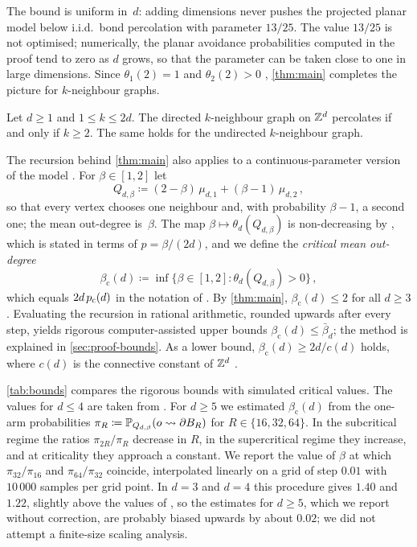 \documentclass[11pt,letterpaper]{article}
\begin{document}
The bound is uniform in~$d$: adding dimensions never pushes the projected planar model below i.i.d.\ bond percolation with parameter $13/25$. The value $13/25$ is not optimised; numerically, the planar avoidance probabilities computed in the proof tend to zero as $d$ grows, so that the parameter can be taken close to one in large dimensions. Since $\theta_1(2)=1$ and $\theta_2(2)>0$ \cite[Theorem~2.3]{CHJK26}, \cref{thm:main} completes the picture for $k$-neighbour graphs.

\begin{corollary}\label{cor:classification}
Let $d\ge1$ and $1\le k\le2d$. The directed $k$-neighbour graph on $\Z^d$ percolates if and only if $k\ge2$. The same holds for the undirected $k$-neighbour graph.
\end{corollary}

The recursion behind \cref{thm:main} also applies to a continuous-parameter version of the model \cite{CHJK26,BJKLRT25}. For $\beta\in[1,2]$ let
\begin{equation*}
Q_{d,\beta}\coloneqq(2-\beta)\,\mu_{d,1}+(\beta-1)\,\mu_{d,2}\,,
\end{equation*}
so that every vertex chooses one neighbour and, with probability $\beta-1$, a second one; the mean out-degree is~$\beta$. The map $\beta\mapsto\theta_d(Q_{d,\beta})$ is non-decreasing by \cite[Lemma~2.1]{CHJK26}, which is stated in terms of $p=\beta/(2d)$, and we define the \emph{critical mean out-degree}
\begin{equation*}
\beta_{\mathrm c}(d)\coloneqq\inf\big\{\beta\in[1,2]\colon\theta_d(Q_{d,\beta})>0\big\}\,,
\end{equation*}
which equals $2d\,\pc(d)$ in the notation of \cite{CHJK26,BJKLRT25}. By \cref{thm:main}, $\beta_{\mathrm c}(d)\le2$ for all $d\ge3$. Evaluating the recursion in rational arithmetic, rounded upwards after every step, yields rigorous computer-assisted upper bounds $\beta_{\mathrm c}(d)\le\bar\beta_d$; the method is explained in \cref{sec:proof-bounds}. As a lower bound, $\beta_{\mathrm c}(d)\ge2d/c(d)$ holds, where $c(d)$ is the connective constant of $\Z^d$ \cite[Lemma~2.2]{CHJK26}.

\cref{tab:bounds} compares the rigorous bounds with simulated critical values. The values for $d\le4$ are taken from \cite[Table~1]{CHJK26}. For $d\ge5$ we estimated $\beta_{\mathrm c}(d)$ from the one-arm probabilities $\pi_R\coloneqq\P_{Q_{d,\beta}}(o\rightsquigarrow\partial B_R)$ for $R\in\{16,32,64\}$. In the subcritical regime the ratios $\pi_{2R}/\pi_R$ decrease in $R$, in the supercritical regime they increase, and at criticality they approach a constant. We report the value of $\beta$ at which $\pi_{32}/\pi_{16}$ and $\pi_{64}/\pi_{32}$ coincide, interpolated linearly on a grid of step $0.01$ with $10\,000$ samples per grid point. In $d=3$ and $d=4$ this procedure gives $1.40$ and $1.22$, slightly above the values of \cite{CHJK26}, so the estimates for $d\ge5$, which we report without correction, are probably biased upwards by about $0.02$; we did not attempt a finite-size scaling analysis.
\end{document}
